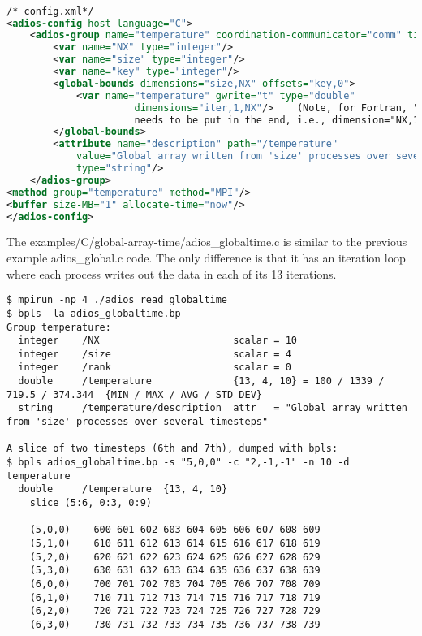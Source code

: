 \begin{lstlisting}[language=XML,caption=Config.xml for a global array with time
(examples/C/global-array-time/adios\_globaltime.xml]

/* config.xml*/
<adios-config host-language="C">
    <adios-group name="temperature" coordination-communicator="comm" time-index="iter">
        <var name="NX" type="integer"/>
        <var name="size" type="integer"/>
        <var name="key" type="integer"/>
        <global-bounds dimensions="size,NX" offsets="key,0">
            <var name="temperature" gwrite="t" type="double" 
                      dimensions="iter,1,NX"/>    (Note, for Fortran, "iter"
                      needs to be put in the end, i.e., dimension="NX,1,iter") 
        </global-bounds>
        <attribute name="description" path="/temperature" 
            value="Global array written from 'size' processes over several timesteps" 
            type="string"/>
    </adios-group>
<method group="temperature" method="MPI"/>
<buffer size-MB="1" allocate-time="now"/>
</adios-config>
\end{lstlisting}

The examples/C/global-array-time/adios\_globaltime.c is similar to the previous 
example adios\_global.c code. The only difference is that it has an iteration loop 
where each process writes out the data in each of its 13 iterations.

\begin{lstlisting}
$ mpirun -np 4 ./adios_read_globaltime
$ bpls -la adios_globaltime.bp 
Group temperature:
  integer    /NX                       scalar = 10
  integer    /size                     scalar = 4
  integer    /rank                     scalar = 0
  double     /temperature              {13, 4, 10} = 100 / 1339 / 719.5 / 374.344  {MIN / MAX / AVG / STD_DEV}
  string     /temperature/description  attr   = "Global array written from 'size' processes over several timesteps"

A slice of two timesteps (6th and 7th), dumped with bpls:
$ bpls adios_globaltime.bp -s "5,0,0" -c "2,-1,-1" -n 10 -d temperature
  double     /temperature  {13, 4, 10}
    slice (5:6, 0:3, 0:9)
    
    (5,0,0)    600 601 602 603 604 605 606 607 608 609
    (5,1,0)    610 611 612 613 614 615 616 617 618 619
    (5,2,0)    620 621 622 623 624 625 626 627 628 629
    (5,3,0)    630 631 632 633 634 635 636 637 638 639
    (6,0,0)    700 701 702 703 704 705 706 707 708 709
    (6,1,0)    710 711 712 713 714 715 716 717 718 719
    (6,2,0)    720 721 722 723 724 725 726 727 728 729
    (6,3,0)    730 731 732 733 734 735 736 737 738 739 

\end{lstlisting}

